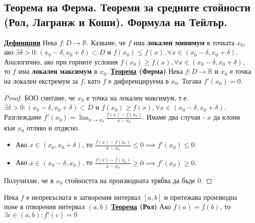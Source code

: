 \documentclass{article}
\begin{document}
\subsection*{Теорема на Ферма. Теореми за средните стойности (Рол, Лагранж и Коши). Формула на Тейлър.}

\textbf{\underline{Дефиниция}}
Нека $f : D \rightarrow \mathbb{R}$. Казваме, че $f$ има \textbf{локален минимум} в точката $x_0$, ако $\exists \delta > 0 :
(x_0 - \delta, x_0 + \delta) \subset D$ и $f(x_0) \le f(x), \forall x \in (x_0 - \delta, x_0 + \delta)$.
Аналогично, ако при горните условия $f(x_0) \ge f(x), \forall x \in (x_0 - \delta, x_0 + \delta)$, то $f$ има
\textbf{локален максимум} в $x_0$. \newline\newline
\textbf{\underline{Теорема} (Ферма)} \newline
Нека $f : D \rightarrow \mathbb{R}$ и $x_0$ е точка на локален екстремум за $f$, като $f$ е диференцируема в $x_0$. Тогава
$f'(x_0) = 0$.
\begin{proof}
БОО считаме, че $x_0$ е точка на локален максимум, т.е. $\exists \delta > 0 : (x_0 - \delta, x_0 + \delta) \subset D$
и $f(x_0) \ge f(x), \forall x \in (x_0 - \delta, x_0 + \delta)$. Разглеждаме $f'(x_0) = \lim_{x \rightarrow x_0} \frac{f(x) -
f(x_0)}{x - x_0}$. Имаме два случая - $x$ да клони към $x_0$ отляво и отдясно.
\begin{itemize}
    \item Ако $x \in (x_0, x_0 + \delta)$, то $\frac{f(x) - f(x_0)}{x - x_0} \le 0 \implies f'(x_0) \le 0$.
    \item Ако $x \in (x_0 - \delta, x_0)$, то $\frac{f(x) - f(x_0)}{x - x_0} \ge 0 \implies f'(x_0) \ge 0$.
\end{itemize}
Получихме, че в $x_0$ стойността на производната трябва да бъде $0$.
\end{proof}
Нека $f$ е непрекъсната в затворения интервал $[a, b]$ и притежава производна поне в отворения интервал $(a, b)$ \newline\newline
\textbf{\underline{Теорема} (Рол)} \newline
Ако $f(a) = f(b)$, то $\exists c \in (a, b) : f'(c) = 0$
\end{document}
